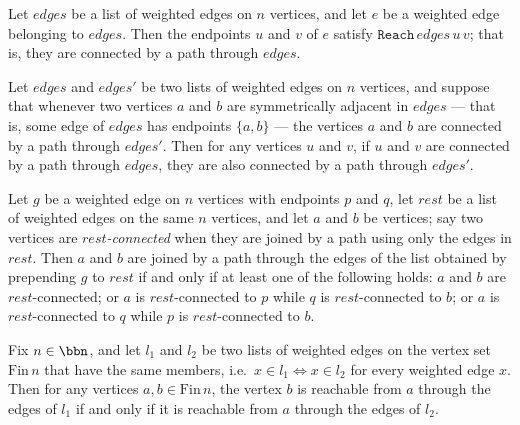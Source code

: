 \begin{lemma}
\label{Kruskal.reach_of_mem}
\leanok
{}
Let $\mathit{edges}$ be a list of weighted edges on $n$ vertices, and let $e$ be a
weighted edge belonging to $\mathit{edges}$. Then the endpoints $u$ and $v$ of $e$
satisfy $\mathtt{Reach}\,\mathit{edges}\,u\,v$; that is, they are connected by a path
through $\mathit{edges}$.
\end{lemma}

\begin{lemma}
\label{Kruskal.reach_lift}
\leanok
{}
Let $\mathit{edges}$ and $\mathit{edges}'$ be two lists of weighted edges on $n$
vertices, and suppose that whenever two vertices $a$ and $b$ are symmetrically adjacent
in $\mathit{edges}$ — that is, some edge of $\mathit{edges}$ has endpoints $\{a,b\}$ —
the vertices $a$ and $b$ are connected by a path through $\mathit{edges}'$. Then for any
vertices $u$ and $v$, if $u$ and $v$ are connected by a path through $\mathit{edges}$,
they are also connected by a path through $\mathit{edges}'$.
\end{lemma}

\begin{lemma}
\label{Kruskal.reach_cons_iff}
\leanok
{}
Let $g$ be a weighted edge on $n$ vertices with endpoints $p$ and $q$, let
$\mathit{rest}$ be a list of weighted edges on the same $n$ vertices, and let $a$ and
$b$ be vertices; say two vertices are \emph{$\mathit{rest}$-connected} when they are
joined by a path using only the edges in $\mathit{rest}$. Then $a$ and $b$ are joined by
a path through the edges of the list obtained by prepending $g$ to $\mathit{rest}$ if
and only if at least one of the following holds: $a$ and $b$ are
$\mathit{rest}$-connected; or $a$ is $\mathit{rest}$-connected to $p$ while $q$ is
$\mathit{rest}$-connected to $b$; or $a$ is $\mathit{rest}$-connected to $q$ while $p$
is $\mathit{rest}$-connected to $b$.
\end{lemma}

\begin{lemma}
\label{Kruskal.reach_mem_iff}
\leanok
{}
Fix $n \in \bbn$, and let $l_1$ and $l_2$ be two lists of weighted edges on the vertex
set $\mathrm{Fin}\,n$ that have the same members, i.e.\ $x \in l_1 \Leftrightarrow x \in
l_2$ for every weighted edge $x$. Then for any vertices $a, b \in \mathrm{Fin}\,n$, the
vertex $b$ is reachable from $a$ through the edges of $l_1$ if and only if it is
reachable from $a$ through the edges of $l_2$.
\end{lemma}

